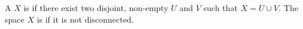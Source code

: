 \begin{definition} \label{definition:disconnected_and_connected_topological_spaces}
A  $X$ is  if there exist two disjoint, non-empty  $U$ and $V$ such that $X = U \cup V$. The space $X$ is  if it is not disconnected.
\end{definition}